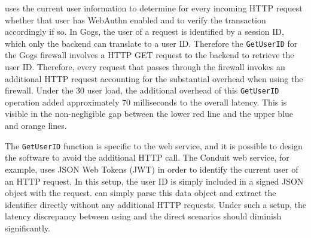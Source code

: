 \sys{} uses the current user information to determine for every incoming HTTP request whether that user has WebAuthn enabled and to verify the transaction accordingly if so. In Gogs, the user of a request is identified by a session ID, which only the backend can translate to a user ID. Therefore the \lstinline{GetUserID} for the Gogs firewall involves a HTTP GET request to the backend to retrieve the user ID. Therefore, every request that passes through the firewall invokes an additional HTTP request accounting for the substantial overhead when using the firewall. Under the 30 user load, the additional overhead of this \lstinline{GetUserID} operation added approximately 70 milliseconds to the overall latency. This is visible in the non-negligible gap between the lower red line and the upper blue and orange lines.

The \lstinline{GetUserID} function is specific to the web service, and it is possible to design the software to avoid the additional HTTP call. The Conduit web service, for example, uses JSON Web Tokens (JWT) in order to identify the current user of an HTTP request. In this setup, the user ID is simply included in a signed JSON object with the request. \sys{} can simply parse this data object and extract the identifier directly without any additional HTTP requests. Under such a setup, the latency discrepancy between using \sys{} and the direct scenarios should diminish significantly.




